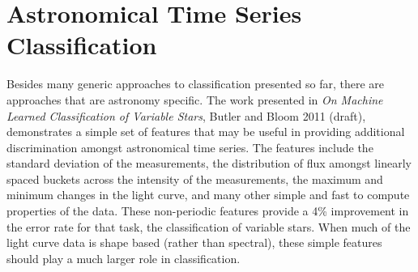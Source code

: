 	\section{Astronomical Time Series Classification}
	Besides many generic approaches to classification presented so far, there are approaches that are astronomy specific. The work presented in \emph{On Machine Learned Classification of Variable Stars}, Butler and Bloom 2011 (draft), demonstrates a simple set of features that may be useful in providing additional discrimination amongst astronomical time series. The features include the standard deviation of the measurements, the distribution of flux amongst linearly spaced buckets across the intensity of the measurements, the maximum and minimum changes in the light curve, and many other simple and fast to compute properties of the data. These non-periodic features provide a 4\% improvement in the error rate for that task, the classification of variable stars. When much of the light curve data is shape based (rather than spectral), these simple features should play a much larger role in classification.
%	
	
	
%	
%
			
